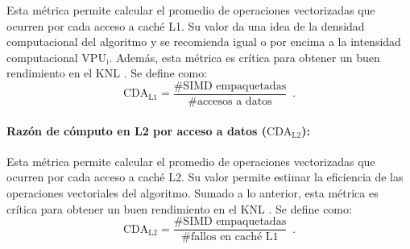 Esta m\'etrica permite calcular el promedio de operaciones vectorizadas que ocurren por cada acceso a cach\'e L1. Su valor da una idea de la densidad computacional del algoritmo y se recomienda igual o por encima a la intensidad computacional $\text{VPU}_{\text{i}}$. Adem\'as, esta m\'etrica es cr\'itica para obtener un buen rendimiento en el KNL \cite{Jeffers2016315}. Se define como:
%
\begin{equation}
\text{CDA}_\text{L1} = \frac{\text{\# SIMD empaquetadas}}{\text{\# accesos a datos}} \enspace .
\end{equation}



\paragraph*{Raz\'on de c\'omputo en L2 por acceso a datos ($\text{CDA}_\text{L2}$):}

Esta m\'etrica permite calcular el promedio de operaciones vectorizadas que ocurren por cada acceso a cach\'e L2. Su valor permite estimar la eficiencia de las operaciones vectoriales del algoritmo. Sumado a lo anterior, esta m\'etrica es cr\'itica para obtener un buen rendimiento en el KNL \cite{Jeffers2016315}. Se define como:
%
\begin{equation}
\text{CDA}_{\text{L2}} = \frac{\text{\# SIMD empaquetadas}}{\text{\# fallos en cach\'e L1}} \enspace .
\end{equation}


%
%
%
%
%
%
%
%



